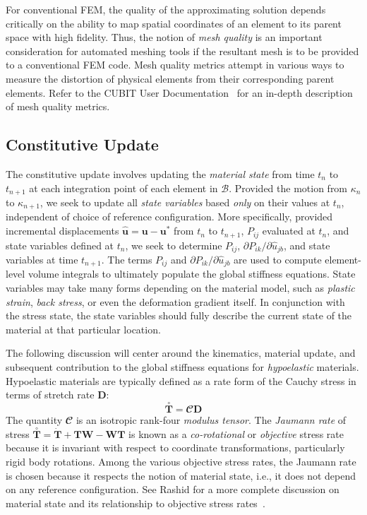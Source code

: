 For conventional FEM, the quality of the approximating solution depends critically on the ability to map spatial coordinates of an element to its parent space with high fidelity. Thus, the notion of \textit{mesh quality} is an important consideration for automated meshing tools if the resultant mesh is to be provided to a conventional FEM code. Mesh quality metrics attempt in various ways to measure the distortion of physical elements from their corresponding parent elements. Refer to the CUBIT User Documentation~\cite{cubit_2018} for an in-depth description of mesh quality metrics.

\subsection{Constitutive Update}

The constitutive update involves updating the \textit{material state} from time $t_n$ to $t_{n+1}$ at each integration point of each element in $\mathcal{B}$. Provided the motion from $\kappa_n$ to $\kappa_{n+1}$, we seek to update all \textit{state variables} based \textit{only} on their values at $t_n$, independent of choice of reference configuration. More specifically, provided incremental displacements $\hat{\bm{u}} = \bm{u} - \bm{u}^*$ from $t_n$ to $t_{n+1}$, $P_{ij}$ evaluated at $t_n$, and state variables defined at $t_n$, we seek to determine $P_{ij}$, $\partial{P_{ik}}/\partial{\hat{u}_{jb}}$, and state variables at time $t_{n+1}$. The terms $P_{ij}$ and $\partial{P_{ik}}/\partial{\hat{u}_{jb}}$ are used to compute element-level volume integrals to ultimately populate the global stiffness equations. State variables may take many forms depending on the material model, such as \textit{plastic strain}, \textit{back stress}, or even the deformation gradient itself. In conjunction with the stress state, the state variables should fully describe the current state of the material at that particular location.

The following discussion will center around the kinematics, material update, and subsequent contribution to the global stiffness equations for \textit{hypoelastic} materials. Hypoelastic materials are typically defined as a rate form of the Cauchy stress in terms of stretch rate $\bm{D}$:
\begin{equation}
\overset{\circ}{\bm{T}} =  {\mathbfcal{C}}\bm{D}
\end{equation}
The quantity ${\mathbfcal{C}}$ is an isotropic rank-four \textit{modulus tensor}. The \textit{Jaumann rate} of stress $\overset{\circ}{\bm{T}} = \dot{\bm{T}} + \bm{T}\bm{W} - \bm{W}\bm{T}$ is known as a \textit{co-rotational} or \textit{objective} stress rate because it is invariant with respect to coordinate transformations, particularly rigid body rotations. Among the various objective stress rates, the Jaumann rate is chosen because it respects the notion of material state, i.e., it does not depend on any reference configuration. See Rashid for a more complete discussion on material state and its relationship to objective stress rates~\cite{rashid_1991}.

